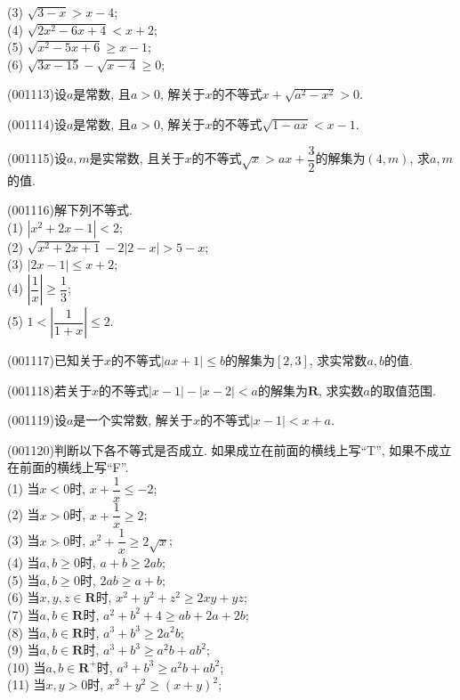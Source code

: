 (3) $\sqrt{3-x}>x-4$;\\ 
(4) $\sqrt{2x^2-6x+4}<x+2$;\\ 
(5) $\sqrt{x^2-5x+6}\geq x-1$;\\ 
(6) $\sqrt{3x-15}-\sqrt{x-4}\ge0$;
\item (001113)设$a$是常数, 且$a>0$, 解关于$x$的不等式$x+\sqrt{a^2-x^2}>0$.
\item (001114)设$a$是常数, 且$a>0$, 解关于$x$的不等式$\sqrt{1-ax}<x-1$.
\item (001115)设$a,m$是实常数, 且关于$x$的不等式$\sqrt{x}>ax+\dfrac{3}{2}$的解集为$(4,m)$, 求$a,m$的值.
\item (001116)解下列不等式.\\ 
(1) $|x^2+2x-1|<2$;\\ 
(2) $\sqrt{x^2+2x+1}-2|2-x|>5-x$;\\ 
(3) $|2x-1|\le x+2$;\\ 
(4) $\left|\dfrac 1x\right|\ge \dfrac 13$;\\ 
(5) $1<\left|\dfrac 1{1+x}\right|\le 2$.
\item (001117)已知关于$x$的不等式$|ax+1|\leq b$的解集为$[2,3]$, 求实常数$a,b$的值.
\item (001118)若关于$x$的不等式$|x-1|-|x-2|<a$的解集为$\mathbf{R}$, 求实数$a$的取值范围.
\item (001119)设$a$是一个实常数, 解关于$x$的不等式$|x-1|<x+a$.
\item (001120)判断以下各不等式是否成立. 如果成立在前面的横线上写``T'', 如果不成立在前面的横线上写``F''.\\ 
(1) 当$x<0$时, $x+\dfrac{1}{x}\le -2$;\\ 
(2) 当$x>0$时, $x+\dfrac{1}{x}\ge 2$;\\ 
(3) 当$x>0$时, $x^2+\dfrac{1}{x}\ge 2\sqrt{x}$;\\ 
(4) 当$a,b\ge 0$时, $a+b\ge 2ab$;\\ 
(5) 当$a,b\ge 0$时, $2ab\ge a+b$;\\ 
(6) 当$x,y,z\in \mathbf{R}$时, $x^2+y^2+z^2\ge 2xy+yz$;\\ 
(7) 当$a,b\in \mathbf{R}$时, $a^2+b^2+4\ge ab+2a+2b$;\\ 
(8) 当$a,b\in \mathbf{R}$时, $a^3+b^3\ge 2a^2b$;\\ 
(9) 当$a,b \in \mathbf{R}$时, $a^3+b^3\ge a^2b+ab^2$;\\ 
(10) 当$a,b\in \mathbf{R}^+$时, $a^3+b^3\ge a^2b+ab^2$;\\ 
(11) 当$x,y>0$时, $x^2+y^2\ge (x+y)^2$;

